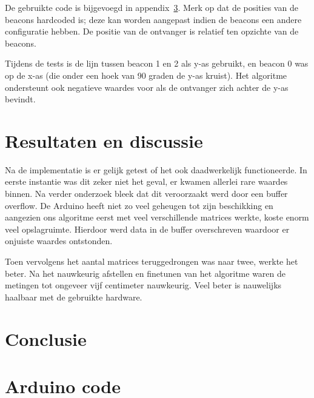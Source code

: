 \documentclass[a4paper,10pt]{article}
\begin{document}
De gebruikte code is bijgevoegd in appendix~\ref{sec:code}. Merk op dat de posities van de beacons hardcoded is; deze kan worden aangepast indien de beacons een andere configuratie hebben. De positie van de ontvanger is relatief ten opzichte van de beacons.

Tijdens de tests is de lijn tussen beacon 1 en 2 als y-as gebruikt, en beacon 0 was op de x-as (die onder een hoek van 90 graden de y-as kruist). Het algoritme ondersteunt ook negatieve waardes voor als de ontvanger zich achter de y-as bevindt.

\section{Resultaten en discussie}\label{sec:resultaten}
Na de implementatie is er gelijk getest of het ook daadwerkelijk functioneerde. In eerste instantie was dit zeker niet het geval, er kwamen allerlei rare waardes binnen. Na verder onderzoek bleek dat dit veroorzaakt werd door een buffer overflow. De Arduino heeft niet zo veel geheugen tot zijn beschikking en aangezien ons algoritme eerst met veel verschillende matrices werkte, koste enorm veel opslagruimte. Hierdoor werd data in de buffer overschreven waardoor er onjuiste waardes ontstonden.

Toen vervolgens het aantal matrices teruggedrongen was naar twee, werkte het beter. Na het nauwkeurig afstellen en finetunen van het algoritme waren de metingen tot ongeveer vijf centimeter nauwkeurig. Veel beter is nauwelijks haalbaar met de gebruikte hardware.

\section{Conclusie}\label{sec:conclusie}




\newpage
\appendix
\section{Arduino code}
\label{sec:code}

\end{document}
